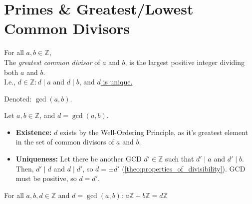 \newpage
\section{Primes \& Greatest/Lowest Common Divisors}

\begin{Def}

    For all $a,b\in\mathbb{Z}$,\\
    The \textit{greatest common divisor} of $a$ and $b$, is the largest positive integer dividing both $a$ and $b$.\\
    I.e., $d\in\mathbb{Z}: d\mid a$ and $d\mid b$, and \underline{$d$ is unique.}

    \noindent
    Denoted: $\gcd(a,b)$.
\end{Def}

\begin{Proof}

    \label{theo:gcd_existence_uniqueness}

    Let $a,b\in\mathbb{Z}$, and $d=\gcd(a,b)$.\\
    \begin{itemize}
        \item  \textbf{Existence:} $d$ exists by the Well-Ordering Principle, 
        as it's greatest element in the set of common divisors of $a$ and $b$.
        \item \textbf{Uniqueness:} Let there be another GCD $d'\in\mathbb{Z}$ such that $d'\mid a$ and $d'\mid b$.\\
        Then, $d'\mid d$ and $d\mid d'$, so $d=\pm d'$ (\ref{theo:properties_of_divisibility}). GCD must be positive, so $d=d'$.
    \end{itemize}

   

\end{Proof}

\begin{theo}

    For all \(a, b,d \in \mathbb{Z}\) and $d=\gcd(a,b)$: \(a\mathbb{Z} + b\mathbb{Z} = d\mathbb{Z}\)

\end{theo}

